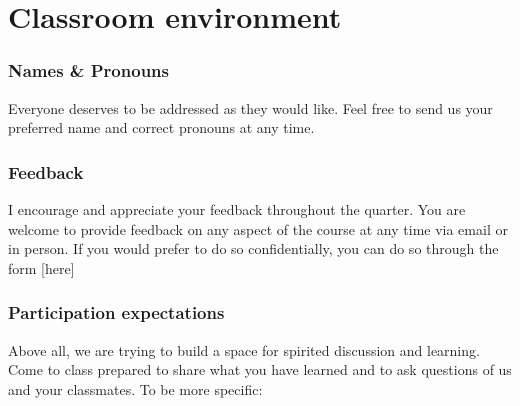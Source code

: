 \documentclass[
]{article}
\begin{document}
\hypertarget{classroom-environment}{%
\section{Classroom environment}\label{classroom-environment}}

\hypertarget{names-pronouns}{%
\subsubsection{Names \& Pronouns}\label{names-pronouns}}

Everyone deserves to be addressed as they would like. Feel free to send
us your preferred name and correct pronouns at any time.

\hypertarget{feedback}{%
\subsubsection{Feedback}\label{feedback}}

I encourage and appreciate your feedback throughout the quarter. You are
welcome to provide feedback on any aspect of the course at any time via
email or in person. If you would prefer to do so confidentially, you can
do so through the form {[}here{]}

\hypertarget{participation-expectations}{%
\subsubsection{Participation
expectations}\label{participation-expectations}}

Above all, we are trying to build a space for spirited discussion and
learning. Come to class prepared to share what you have learned and to
ask questions of us and your classmates. To be more specific:
\end{document}
